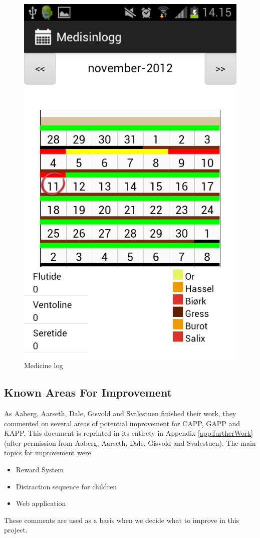 \begin{figure}[H]
\begin{minipage}[b]{0.4\linewidth}
		\includegraphics[width=0.20\paperwidth]{Pictures/app-screenshots/logg.png}
		\caption{Medicine log}
		\label{fig:medicine-log}
	\end{minipage}
	
\end{figure}

\subsection{Known Areas For Improvement}
\label{sec:improvements}
As Aaberg, Aarseth, Dale, Gisvold and Svalestuen finished their work, they commented on several areas of potential improvement for CAPP, GAPP and KAPP. This document is reprinted in its entirety in Appendix \ref{app:furtherWork} (after permission from Aaberg, Aarseth, Dale, Gisvold and Svalestuen). The main topics for improvement were
\begin{itemize}
\item{Reward System}
\item{Distraction sequence for children}
\item{Web application}
\end{itemize}


These comments are used as a basis when we decide what to improve in this project. 




